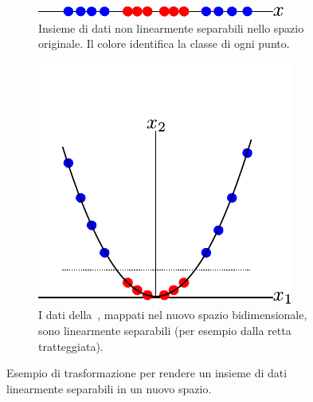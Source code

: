 \begin{figure}
    \begin{subfigure}[t]{.45\textwidth}
        \centering
        \includegraphics[width=\textwidth]{img/non_linearmente_separabili.pdf}
        \caption{Insieme di dati non linearmente separabili nello spazio originale. Il colore identifica la classe di ogni punto.}
        \label{fig:kerneltrick:non_lin_sep}
    \end{subfigure}%
    \hfill
    \begin{subfigure}[t]{.45\textwidth}
        \centering
        \includegraphics[width=\textwidth]{img/kernel_trick_visualized.pdf}
        \caption{I dati della~, mappati nel nuovo spazio bidimensionale, sono linearmente separabili (per esempio dalla retta tratteggiata).}
        \label{fig:kerneltrick:visualized}
    \end{subfigure}%
    \caption{Esempio di trasformazione per rendere un insieme di dati linearmente separabili in un nuovo spazio.}
\end{figure}


